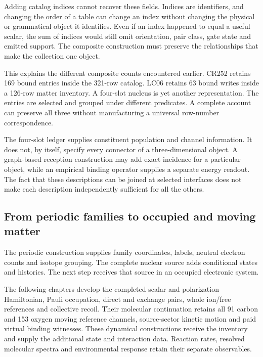 Adding catalog indices cannot recover these fields. Indices are identifiers, and changing the order of a table can change an index without changing the physical or grammatical object it identifies. Even if an index happened to equal a useful scalar, the sum of indices would still omit orientation, pair class, gate state and emitted support. The composite construction must preserve the relationships that make the collection one object.

This explains the different composite counts encountered earlier. CR252 retains 169 bound entries inside the 321-row catalog. LC06 retains 63 bound writes inside a 126-row matter inventory. A four-slot nucleus is yet another representation. The entries are selected and grouped under different predicates. A complete account can preserve all three without manufacturing a universal row-number correspondence.

The four-slot ledger supplies constituent population and channel information. It does not, by itself, specify every connector of a three-dimensional object. A graph-based reception construction may add exact incidence for a particular object, while an empirical binding operator supplies a separate energy readout. The fact that these descriptions can be joined at selected interfaces does not make each description independently sufficient for all the others.

\subsection{From periodic families to occupied and moving matter}

The periodic construction supplies family coordinates, labels, neutral electron counts and isotope grouping. The complete nuclear source adds conditional states and histories. The next step receives that source in an occupied electronic system.

The following chapters develop the completed scalar and polarization Hamiltonian, Pauli occupation, direct and exchange pairs, whole ion/free references and collective recoil. Their molecular continuation retains all 91 carbon and 153 oxygen moving reference channels, source-sector kinetic motion and paid virtual binding witnesses. These dynamical constructions receive the inventory and supply the additional state and interaction data. Reaction rates, resolved molecular spectra and environmental response retain their separate observables.

